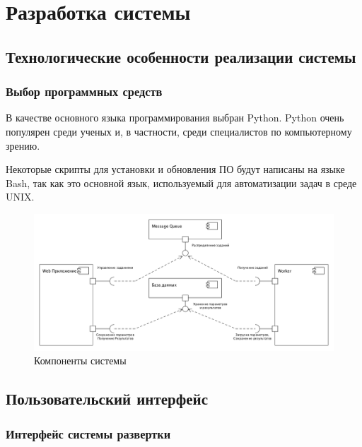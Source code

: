 \chapter{Разработка системы}

\section{Технологические особенности реализации системы}

\subsection{Выбор программных средств}

В качестве основного языка программирования выбран Python. Python очень популярен среди ученых и, в частности, среди специалистов по компьютерному зрению.

Некоторые скрипты для установки и обновления ПО будут написаны на языке Bash, так как это основной язык, используемый для автоматизации задач в среде UNIX.

\begin{figure}[h]
  \centering
  \includegraphics[width=1\textwidth]{assets/components-1.png}
  \caption{Компоненты системы}
  \label{fig:fig01}
\end{figure}



\section{Пользовательский интерфейс}

\subsection{Интерфейс системы развертки}

